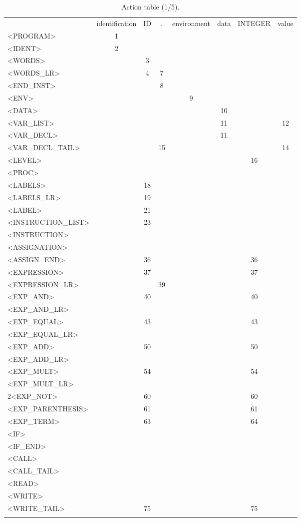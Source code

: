 \documentclass[a4paper,11pt]{article}
\begin{document}
\newpage
\begin{longtable}{l||ccccccc}
	& identification & ID & . & environment & data & INTEGER & value\\
	<PROGRAM> & 1 & & & & & & \\
	<IDENT> & 2 & & & & & & \\
	<WORDS> &  & 3 & & & & & \\
	<WORDS\_LR> & & 4 & 7 & & & & \\
	<END\_INST> & & & 8 & & & & \\
	<ENV> & & & & 9 & & & \\
	<DATA> & & & & & 10 & & \\
	<VAR\_LIST> & & & & & 11 & & 12 \\
	<VAR\_DECL> & & & & & 11 & & \\
	<VAR\_DECL\_TAIL> & & & 15 & & & & 14 \\
	<LEVEL> & & & & & & 16 & \\
	<PROC> & & & & & & & \\
	<LABELS> & & 18 & & & & & \\
	<LABELS\_LR> & & 19 & & & & & \\
	<LABEL> & & 21 & & & & & \\
	<INSTRUCTION\_LIST> & & 23 & & & & & \\
	<INSTRUCTION> & & & & & & & \\
	<ASSIGNATION> & & & & & & & \\
	<ASSIGN\_END> & & 36 & & & & 36 & \\
	<EXPRESSION> & & 37 & & & & 37 & \\
	<EXPRESSION\_LR> & & & 39 & & & & \\
	<EXP\_AND> & & 40 & & & & 40 & \\
	<EXP\_AND\_LR> & & & & & & & \\
	<EXP\_EQUAL> & & 43 & & & & 43 & \\
	<EXP\_EQUAL\_LR> & & & & & & & \\
	<EXP\_ADD> & & 50 & & & & 50 & \\
	<EXP\_ADD\_LR> & & & & & & & \\
	<EXP\_MULT> & & 54 & & & & 54 & \\
	<EXP\_MULT\_LR> & & & & & & & \\
	2<EXP\_NOT> & & 60 & & & & 60 & \\
	<EXP\_PARENTHESIS> & & 61 & & & & 61 & \\
	<EXP\_TERM> & & 63 & & & & 64 & \\
	<IF> & & & & & & & \\
	<IF\_END> & & & & & & & \\
	<CALL> & & & & & & & \\
	<CALL\_TAIL> & & & & & & & \\
	<READ> & & & & & & & \\
	<WRITE> & & & & & & & \\
	<WRITE\_TAIL> & & 75 & & & & 75 & \\
	\caption{Action table (1/5).}
\end{longtable}
\end{document}
